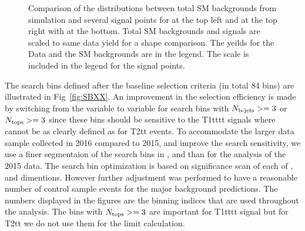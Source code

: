 \begin{figure}[h]
\begin{center}
    \caption{Comparison of the distributions between total SM backgrounds from simulation and several signal points for \MET at the top left and \MTTwo at the top right with \HT at the bottom. Total SM backgrounds and signals are scaled to same data yield for a shape comparison. The yeilds for the Data and the SM backgrounds are in the legend.  The scale is included in the legend for the signal points. }
    \label{fig:compSBvars2}
  \end{center}
\end{figure}

The search bins defined after the baseline selection criteria (in total 84 bins) are illustrated in Fig~\ref{fig:SBXX}. An improvement in the selection efficiency is made by switching from the \MTTwo variable to \HT variable for search bins with $N_{\text{b-jets}}>=3$ or $N_{\text{tops}}>=3$ since these bins should be sensitive to the T1tttt signals where \MTTwo cannot be as clearly defined as for T2tt events.
To accommodate the larger data sample collected in 2016 compared to 2015, and improve the search sensitivity, we use a finer segmentaion of the search bins in
\MET, \HT and \MTTwo than for the analysis of the 2015 data. The search bin optimization is based on significance scan of each of \MET, \MTTwo and \HT dimentions. However
further adjustment was performed to have a reasonable number of control sample events for the major background predictions.
The numbers displayed in the figures are the binning indices that are used throughout the analysis.
The bins with $N_{\text{tops}}>=3$ are important for T1tttt signal but for T2tt we do not use them for the limit calculation.

